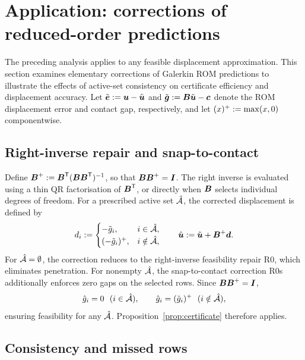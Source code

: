 
\section{Application: corrections of reduced-order predictions}\label{sec:application}

The preceding analysis applies to any feasible displacement approximation. This section examines elementary corrections of Galerkin ROM predictions to illustrate the effects of active-set consistency on certificate efficiency and displacement accuracy. Let $\tilde{\boldsymbol{e}}:=\boldsymbol{u}-\tilde{\boldsymbol{u}}$ and $\tilde{\boldsymbol{g}}:=\boldsymbol{B}\tilde{\boldsymbol{u}}-\boldsymbol{c}$ denote the ROM displacement error and contact gap, respectively, and let $(x)^{+}:=\max(x,0)$ componentwise.

\subsection{Right-inverse repair and snap-to-contact}

Define $\boldsymbol{B}^{+}:=\boldsymbol{B}^{\mathsf{T}}(\boldsymbol{B}\boldsymbol{B}^{\mathsf{T}})^{-1}$, so that $\boldsymbol{B}\boldsymbol{B}^{+}=\boldsymbol{I}$. The right inverse is evaluated using a thin QR factorisation of $\boldsymbol{B}^{\mathsf{T}}$, or directly when $\boldsymbol{B}$ selects individual degrees of freedom. For a prescribed active set $\hat{\mathcal{A}}$, the corrected displacement is defined by
\begin{equation}\label{eq:snap}
  d_i:=\begin{cases}-\tilde g_i,& i\in\hat{\mathcal{A}},\\ (-\tilde g_i)^{+},& i\notin\hat{\mathcal{A}},\end{cases}\qquad \hat{\boldsymbol{u}}:=\tilde{\boldsymbol{u}}+\boldsymbol{B}^{+}\boldsymbol{d} .
\end{equation}
For $\hat{\mathcal{A}}=\emptyset$, the correction reduces to the right-inverse feasibility repair R0, which eliminates penetration. For nonempty $\hat{\mathcal{A}}$, the snap-to-contact correction R0s additionally enforces zero gaps on the selected rows. Since $\boldsymbol{B}\boldsymbol{B}^{+}=\boldsymbol{I}$,
\begin{equation}\label{eq:snap-gap}
  \hat g_i=0\ \ (i\in\Ahat),\qquad \hat g_i=\pos{\tilde g_i}\ \ (i\notin\Ahat),
\end{equation}
ensuring feasibility for any $\hat{\mathcal{A}}$. Proposition~\ref{prop:certificate} therefore applies.

\subsection{Consistency and missed rows}

